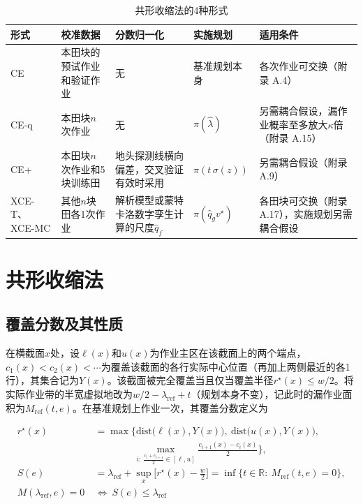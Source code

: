\documentclass[preprint,12pt,number,sort&compress]{elsarticle}
\begin{document}
\begin{table}[H]
\centering
\footnotesize
\caption{共形收缩法的4种形式}\label{tab:1}
\begin{tabularx}{\textwidth}{@{}l>{\raggedright\arraybackslash\hsize=0.76\hsize}X>{\raggedright\arraybackslash\hsize=1.12\hsize}Xl>{\raggedright\arraybackslash\hsize=1.12\hsize}X@{}}
\toprule
\textbf{形式} & \textbf{校准数据} & \textbf{分数归一化} & \textbf{实施规划} & \textbf{适用条件} \\
\midrule
CE & 本田块的预试作业和验证作业 & 无 & 基准规划本身 & 各次作业可交换（附录 A.4） \\
CE-q & 本田块\(n\)次作业 & 无 & \(\pi(\hat\lambda)\) & 另需耦合假设，漏作业概率至多放大\(\kappa\)倍（附录 A.15） \\
CE+ & 本田块\(n\)次作业和5块训练田 & 地头探测线横向偏差，交叉验证有效时采用 & \(\pi(t\,\sigma(z))\) & 另需耦合假设（附录 A.9） \\
XCE-T、XCE-MC & 其他\(n\)块田各1次作业 & 解析模型或蒙特卡洛数字孪生计算的尺度\(\hat q_f\) & \(\pi(\hat q_g v^\star)\) & 各田块可交换（附录 A.17），实施规划另需耦合假设 \\
\bottomrule
\end{tabularx}
\end{table}

\section{共形收缩法}

\subsection{覆盖分数及其性质}

在横截面\(x\)处，设\(\ell(x)\)和\(u(x)\)为作业主区在该截面上的两个端点，\(c_1(x)<c_2(x)<\cdots\)为覆盖该截面的各行实际中心位置（再加上两侧最近的各1行），其集合记为\(Y(x)\)。该截面被完全覆盖当且仅当覆盖半径\(r^\star(x)\le w/2\)。将实际作业带的半宽虚拟地改为\(w/2-\lambda_\mathrm{ref}+t\)（规划本身不变），记此时的漏作业面积为\(M_\mathrm{ref}(t,e)\)。在基准规划上作业一次，其覆盖分数定义为

\begin{equation}
\begin{aligned}
r^\star(x)&=\max\Big\{\mathrm{dist}\big(\ell(x),Y(x)\big),\ \mathrm{dist}\big(u(x),Y(x)\big),\\
&\qquad\qquad\max_{i:\ \frac{c_i+c_{i+1}}{2}\in[\ell,u]}\frac{c_{i+1}(x)-c_i(x)}{2}\Big\},\\
S(e)&=\lambda_\mathrm{ref}+\sup_{x}\Big[r^\star(x)-\frac w2\Big]=\inf\big\{t\in\mathbb R:\ M_\mathrm{ref}(t,e)=0\big\},\\
M(\lambda_\mathrm{ref},e)=0\ &\iff\ S(e)\le\lambda_\mathrm{ref}
\end{aligned}
\end{equation}
\end{document}
